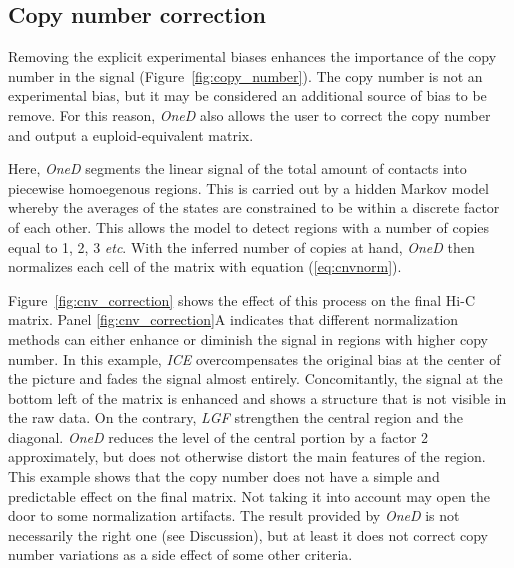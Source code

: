 \documentclass{bioinfo}
\begin{document}
\subsection{Copy number correction}

Removing the explicit experimental biases enhances the importance of the
copy number in the signal (Figure~\ref{fig:copy_number}). The copy number
is not an experimental bias, but it may be considered an additional source
of bias to be remove. For this reason, \textit{OneD} also allows the user
to correct the copy number and output a euploid-equivalent matrix.

Here, \textit{OneD} segments the linear signal of the total amount of
contacts into piecewise homoegenous regions. This is carried out by a
hidden Markov model whereby the averages of the states are constrained to
be within a discrete factor of each other. This allows the model to detect
regions with a number of copies equal to 1, 2, 3 \textit{etc}. With the
inferred number of copies at hand, \textit{OneD} then normalizes each cell
of the matrix with equation (\ref{eq:cnvnorm}).

Figure~\ref{fig:cnv_correction} shows the effect of this process on the
final Hi-C matrix. Panel \ref{fig:cnv_correction}A indicates that
different normalization methods can either enhance or diminish the signal
in regions with higher copy number. In this example, \textit{ICE}
overcompensates the original bias at the center of the picture and fades
the signal almost entirely. Concomitantly, the signal at the bottom left
of the matrix is enhanced and shows a structure that is not visible in the
raw data. On the contrary, \textit{LGF} strengthen the central region and
the diagonal. \textit{OneD} reduces the level of the central portion by a
factor 2 approximately, but does not otherwise distort the main features
of the region. This example shows that the copy number does not have a
simple and predictable effect on the final matrix. Not taking it into
account may open the door to some normalization artifacts. The result
provided by \textit{OneD} is not necessarily the right one (see
Discussion), but at least it does not correct copy number variations
as a side effect of some other criteria.
\end{document}
